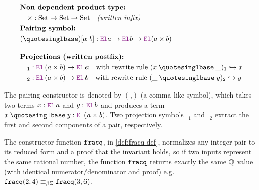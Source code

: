 \begin{definition}\label{def-product}
\begin{align*}
&\textbf{Non dependent product type:} \\
&\quad \times : \text{Set} \to \text{Set} \to \text{Set} \quad \textit{(written infix)} \\
&\textbf{Pairing symbol:} \\
&(\mathbin{‚}) [a~b] : \el a \ra \el b \ra \el (a \times b)\\[1em]
&\textbf{Projections (written postfix):}  \\
&\quad {}_1 : \el\, (a \times b) \ra \el\, a \quad \text{with rewrite rule } (x \mathbin{‚} \_)_1 \re x \\
&\quad {}_2 : \el\, (a \times b) \ra \el\, b \quad \text{with rewrite rule } (\_ \mathbin{‚} y)_2 \re y
\end{align*}
\end{definition}

The pairing constructor is denoted by $(‚)$ (a comma-like symbol), which takes two terms $x : \el\,a$ and $y : \el\, b$ and produces a term $x \mathbin{‚} y : \el (a \times b)$.
Two projection symbols ${\_}_1$ and ${\_}_2$ extract the first and second components of a pair, respectively.

The constructor function $\texttt{\upshape{fracq}}$, in \cref{def:fracq-def}, normalizes any integer pair to its reduced form and a proof that the invariant holds, so if two inputs represent the same rational number,
the function $\texttt{\upshape{fracq}}$ returns exactly the same $\mathbb{Q}$ value (with identical numerator/denominator and proof) e.g. $\texttt{\upshape{fracq}} (2,4) \equiv_{\beta\Sigma} \texttt{\upshape{fracq}} (3,6)$.

